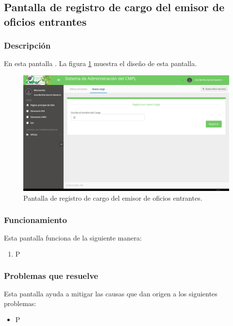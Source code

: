 \subsection{Pantalla de registro de cargo del emisor de oficios entrantes}
\subsubsection{Descripción}
	En esta pantalla . La figura \ref{fig:NuevoCargoEmisor} muestra el diseño de esta pantalla.		
		
	\begin{figure}[htbp!]
		\centering
			\includegraphics[width=1\textwidth]{Pantallas/NuevoCargoEmisor.png}
		\caption{Pantalla de registro de cargo del emisor de oficios entrantes.}
		\label{fig:NuevoCargoEmisor}
	\end{figure}

\subsubsection{Funcionamiento}
	Esta pantalla funciona de la siguiente manera:
	
	\begin{enumerate}
		\item P
	\end{enumerate}

\subsubsection{Problemas que resuelve}
Esta pantalla ayuda a mitigar las causas que dan origen a los siguientes problemas:

	\begin{itemize}
		\item P
	\end{itemize}

